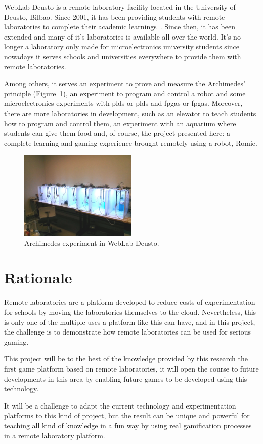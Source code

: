 WebLab-Deusto is a remote laboratory facility located in the University of Deusto, Bilbao. Since
2001, it has been providing students with remote laboratories to complete their academic
learnings~\cite{weblab}. Since then, it has been extended and many of it's laboratories is available
all over the world. It's no longer a laboratory only made for microelectronics university students
since nowadays it serves schools and universities everywhere to provide them with remote
laboratories.

Among others, it serves an experiment to prove and measure the Archimedes' principle
(Figure~\ref{fig:archimedes}), an experiment to program and control a robot and some
microelectronics experiments with \acrlong{pld}s or \acrshort{pld}s and \acrlong{fpga}s or
\acrshort{fpga}s. Moreover, there are more laboratories in development, such as an elevator to teach
students how to program and control them, an experiment with an aquarium where students can give
them food and, of course, the project presented here: a complete learning and gaming experience
brought remotely using a robot, Romie.

\begin{figure}[!htbp]
	\centering
	\includegraphics[width=0.5\textwidth]{fig/archimedes.jpg}
	\caption{Archimedes experiment in WebLab-Deusto.}\label{fig:archimedes}
\end{figure}

\section{Rationale}

Remote laboratories are a platform developed to reduce costs of experimentation for schools by
moving the laboratories themselves to the cloud. Nevertheless, this is only one of the multiple uses
a platform like this can have, and in this project, the challenge is to demonstrate how remote
laboratories can be used for serious gaming.

This project will be to the best of the knowledge provided by this research the first game platform
based on remote laboratories, it will open the course to future developments in this area by
enabling future games to be developed using this technology.

It will be a challenge to adapt the current technology and experimentation platforms to this kind of
project, but the result can be unique and powerful for teaching all kind of knowledge in a fun way
by using real gamification processes in a remote laboratory platform.

